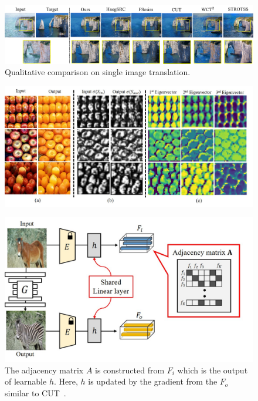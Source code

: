 \documentclass[letterpaper]{article} %
\begin{document}
\begin{figure}[!t]
	\centering
	\includegraphics[width=0.9\linewidth]{figs/single2.png}
	\caption{Qualitative comparison on single image translation.}
	\label{fig:single}
\end{figure}







\begin{figure}[t]
	\centering
	\includegraphics[width=0.85\linewidth]{figs/analy_21.jpg}
	\label{fig:analy}
\end{figure}

\begin{figure}[!t]
	\centering
	\includegraphics[width=0.85\linewidth]{figs/adj_FC_h.jpg}
	\caption{The adjacency matrix $A$ is constructed from $F_i$ which is the output of learnable $h$. Here, $h$ is updated by the gradient from the $F_o$ similar to CUT~\cite{cut}. }
	\label{fig:adj_FC}
\end{figure}
\end{document}
